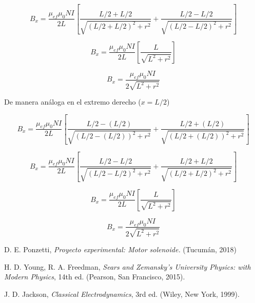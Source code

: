 \documentclass[a4paper,12pt]{article}
\begin{document}
    \begin{equation*}
        B_x = \frac{\mu_{ef}\mu_0 N I}{2L} \left[ \frac{L/2 + L/2}{\sqrt{(L/2 + L/2)^2 + r^2}} + \frac{L/2 - L/2}{\sqrt{(L/2 - L/2)^2 + r^2}} \right]
    \end{equation*}

    \begin{equation*}
        B_x = \frac{\mu_{ef}\mu_0 N I}{2L} \left[ \frac{L}{\sqrt{L^2 + r^2}} \right]
    \end{equation*}

    \begin{equation*}
        B_x = \frac{\mu_{ef}\mu_0 N I}{2\sqrt{L^2 + r^2}}
    \end{equation*}

\newpage

De manera análoga en el extremo derecho ($x=L/2$)

    \begin{equation*}
        B_x = \frac{\mu_{ef}\mu_0 N I}{2L} \left[ \frac{L/2 - (L/2)}{\sqrt{(L/2 - (L/2))^2 + r^2}} + \frac{L/2 + (L/2)}{\sqrt{(L/2 + (L/2))^2 + r^2}} \right]
    \end{equation*}

    \begin{equation*}
        B_x = \frac{\mu_{ef}\mu_0 N I}{2L} \left[ \frac{L/2 - L/2}{\sqrt{(L/2 - L/2)^2 + r^2}} + \frac{L/2 + L/2}{\sqrt{(L/2 + L/2)^2 + r^2}} \right]
    \end{equation*}

    \begin{equation*}
        B_x = \frac{\mu_{ef}\mu_0 N I}{2L} \left[ \frac{L}{\sqrt{L^2 + r^2}} \right]
    \end{equation*}
    
    \begin{equation*}
        B_x = \frac{\mu_{ef}\mu_0 N I}{2\sqrt{L^2 + r^2}}
    \end{equation*}

\begin{thebibliography}{99}

     D. E. Ponzetti, \emph{Proyecto experimental: Motor solenoide.} (Tucumán, 2018)

     H. D. Young, R. A. Freedman, \emph{Sears and Zemansky's University Physics: with Modern Physics}, 14th ed. (Pearson, San Francisco, 2015).

     J. D. Jackson, \emph{Classical Electrodynamics}, 3rd ed. (Wiley, New York, 1999).

\end{thebibliography}
\end{document}
